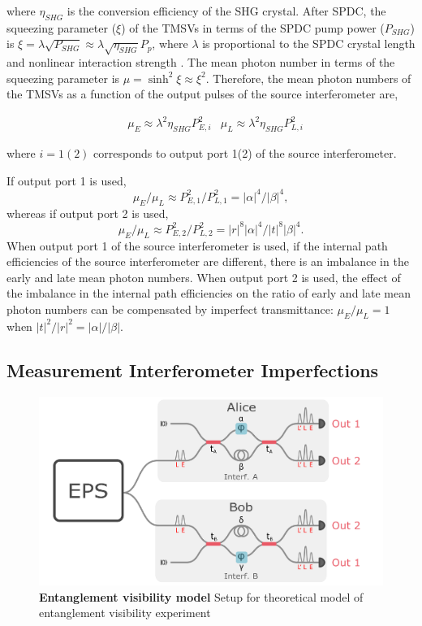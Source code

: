 \documentclass[11pt]{caltech_thesis} %
\begin{document}
where $\eta_{SHG}$ is the conversion efficiency of the SHG crystal.
After SPDC, the squeezing parameter ($\xi$) of the TMSVs in terms of the SPDC pump power ($P_{SHG}$) is $\xi = \lambda \sqrt{P_{SHG}} \approx \lambda \sqrt{\eta_{SHG}}P_p$, where $\lambda$ is proportional to the SPDC crystal length and nonlinear interaction strength \autocite{kaiser2016fully}.
The mean photon number in terms of the squeezing parameter is $\mu = \sinh^2{\xi}\approx \xi^2$. Therefore, the mean photon numbers of the TMSVs as a function of the output pulses of the source interferometer are,

\begin{align}
    &\mu_E \approx \lambda^2 \eta_{SHG} P_{E,i}^2 &\mu_L\approx \lambda^2 \eta_{SHG} P_{L,i}^2
\end{align}

where $i = 1(2)$ corresponds to output port 1(2) of the source interferometer.

If output port 1 is used, $$\mu_E/\mu_L \approx P_{E,1}^2/P_{L,1}^2 = |\alpha|^4/|\beta|^4,$$ whereas if output port 2 is used, $$\mu_E/\mu_L \approx P_{E,2}^2/P_{L,2}^2 = |r|^8|\alpha|^4/|t|^8|\beta|^4.$$
When output port 1 of the source interferometer is used, if the internal path efficiencies of the source interferometer are different, there is an imbalance in the early and late mean photon numbers. When output port 2 is used, the effect of the imbalance in the internal path efficiencies on the ratio of early and late mean photon numbers can be compensated by imperfect transmittance: $\mu_E/\mu_L = 1$ when $|t|^2/|r|^2 = |\alpha|/|\beta|$.

\hypertarget{measurement-interferometer-imperfections}{%
\subsection{Measurement Interferometer Imperfections}\label{measurement-interferometer-imperfections}}

\hypertarget{fig:ent_visib_model}{%
\begin{figure}
\centering
\includegraphics[width=1\textwidth,height=\textheight]{./chapter_09/figs/ent_visib_model.png}
\caption[{Entanglement visibility model}]{\textbf{Entanglement visibility model} Setup for theoretical model of entanglement visibility experiment}
\label{fig:ent_visib_model}
\end{figure}
}
\end{document}
